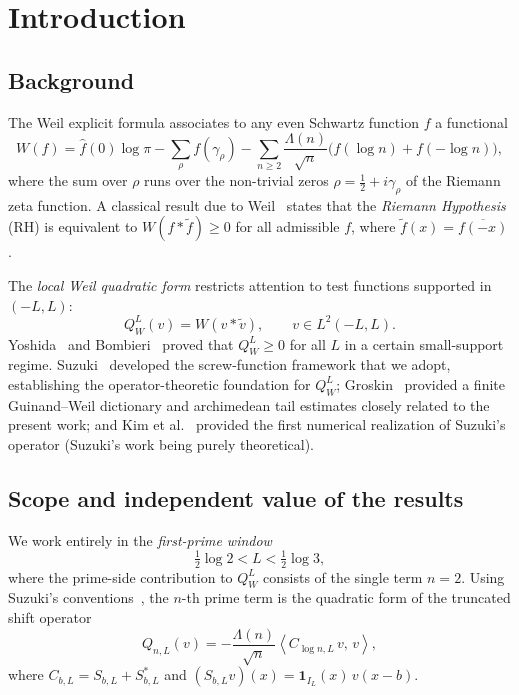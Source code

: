 \documentclass[12pt,a4paper]{amsart}
\theoremstyle{plain}
\theoremstyle{definition}
\newcommand{\ip}[2]{\left\langle #1,\, #2\right\rangle}
\begin{document}
\section{Introduction}
\label{sec:intro}

\subsection{Background}

The Weil explicit formula associates to any even Schwartz function $f$ a
functional
\[
  W(f) = \hat f(0)\log\pi - \sum_\rho f(\gamma_\rho)
         - \sum_{n \ge 2} \frac{\Lambda(n)}{\sqrt n}
           \bigl(f(\log n) + f(-\log n)\bigr),
\]
where the sum over $\rho$ runs over the non-trivial zeros $\rho = \tfrac12 +
i\gamma_\rho$ of the Riemann zeta function.
A classical result due to Weil~\cite{Weil1952} states that the
\emph{Riemann Hypothesis} (RH) is equivalent to $W(f * \widetilde f) \ge 0$
for all admissible $f$, where $\widetilde f(x) = \overline{f(-x)}$.

The \emph{local Weil quadratic form} restricts attention to test functions
supported in $(-L,L)$:
\[
  Q_W^L(v) = W(v * \widetilde v), \qquad v \in L^2(-L,L).
\]
Yoshida~\cite{Yoshida1992} and Bombieri~\cite{Bombieri2000} proved that
$Q_W^L \ge 0$ for all $L$ in a certain small-support regime.
Suzuki~\cite{Suzuki2026} developed the screw-function framework that we adopt,
establishing the operator-theoretic foundation for $Q_W^L$;
Groskin~\cite{Groskin2026} provided a finite Guinand--Weil dictionary
and archimedean tail estimates closely related to the present work;
and Kim et al.~\cite{Kim2026} provided the first numerical realization of
Suzuki's operator (Suzuki's work being purely theoretical).

\subsection{Scope and independent value of the results}

We work entirely in the \emph{first-prime window}
\[
  \tfrac{1}{2}\log 2 < L < \tfrac{1}{2}\log 3,
\]
where the prime-side contribution to $Q_W^L$ consists of the single term
$n = 2$.
Using Suzuki's conventions~\cite{Suzuki2026}, the $n$-th prime term is the
quadratic form of the truncated shift operator
\[
  Q_{n,L}(v) = -\frac{\Lambda(n)}{\sqrt n}\ip{C_{\log n,L}\,v}{v},
\]
where $C_{b,L} = S_{b,L} + S_{b,L}^*$ and
$(S_{b,L}v)(x) = \mathbf{1}_{I_L}(x)\,v(x-b)$.
\end{document}
